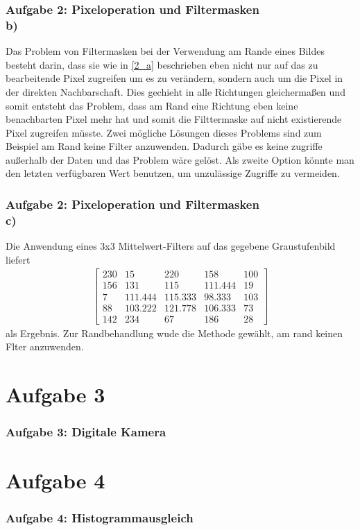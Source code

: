 \documentclass[accentcolor=tud1a,colorbacktitle,inverttitle,landscape,german,presentation,t]{tudbeamer}
\begin{document}
	\begin{frame}
		\frametitle{Aufgabe 2: Pixeloperation und Filtermasken \\ b)}
		Das Problem von Filtermasken bei der Verwendung am Rande eines Bildes besteht darin, dass sie wie in \ref{2_a} beschrieben eben nicht nur auf das zu bearbeitende Pixel zugreifen um es  zu verändern, sondern auch um die Pixel in der direkten Nachbarschaft. Dies gechieht in alle Richtungen gleichermaßen und somit entsteht das Problem, dass am Rand eine Richtung eben keine benachbarten Pixel mehr hat und somit die Filttermaske auf nicht existierende Pixel zugreifen müsste. Zwei mögliche Lösungen dieses Problems sind zum Beispiel am Rand keine Filter anzuwenden. Dadurch gäbe es keine zugriffe außerhalb der Daten und das Problem wäre gelöst. Als zweite Option könnte man den letzten verfügbaren Wert benutzen, um unzulässige Zugriffe zu vermeiden. 
	\end{frame}
	
	\begin{frame}
		\frametitle{Aufgabe 2: Pixeloperation und Filtermasken \\ c)}
	
		Die Anwendung eines 3x3 Mittelwert-Filters auf das gegebene Graustufenbild liefert
		\begin{align*}
		\begin{bmatrix}
		230 & 15 & 220 & 158 & 100 \\
		156 & 131 & 115 & 111.444 & 19\\
		7 & 111.444 & 115.333 & 98.333 & 103\\
		88 & 103.222 & 121.778 & 106.333 & 73\\
		142 &234 & 67 & 186 & 28
		\end{bmatrix}
		\end{align*}
		als Ergebnis. Zur Randbehandlung wude die Methode gewählt, am rand keinen Flter anzuwenden.
	\end{frame}

\section{Aufgabe 3}
	\begin{frame}[t]
		\frametitle{Aufgabe 3: Digitale Kamera}

	\end{frame}
\section{Aufgabe 4}
	\begin{frame}[t]
		\frametitle{Aufgabe 4: Histogrammausgleich}
	\end{frame}
\end{document}
